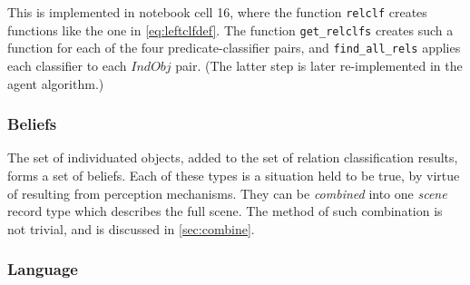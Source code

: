 This is implemented in notebook cell 16, where the function \texttt{relclf} creates functions like the one in \autoref{eq:leftclfdef}.
The function \texttt{get\_relclfs} creates such a function for each of the four predicate-classifier pairs, and \texttt{find\_all\_rels} applies each classifier to each $IndObj$ pair.
(The latter step is later re-implemented in the agent algorithm.)

\subsubsection{Beliefs}

The set of individuated objects, added to the set of relation classification results, forms a set of beliefs.
Each of these types is a situation held to be true, by virtue of resulting from perception mechanisms.
They can be \textit{combined} into one \textit{scene} record type which describes the full scene.
The method of such combination is not trivial, and is discussed in \autoref{sec:combine}.



\subsubsection{Language}
\label{sec:ttrlanguage}

